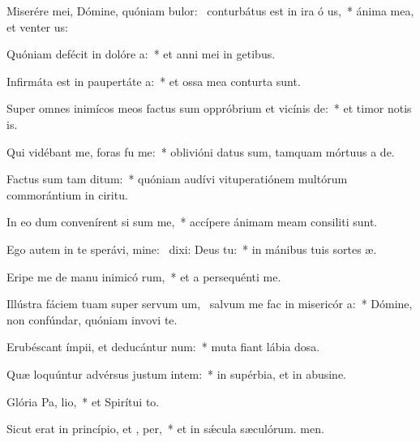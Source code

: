 \item Miserére mei, Dómine, quóniam bulor:~\pscross{} conturbátus est in ira ó us,~* ánima mea, et venter us:
\item Quóniam defécit in dolóre  a:~* et anni mei in getibus.
\item Infirmáta est in paupertáte  a:~* et ossa mea conturta sunt.
\item Super omnes inimícos meos factus sum oppróbrium et vicínis  de:~* et timor notis is.
\item Qui vidébant me, foras fu  me:~* oblivióni datus sum, tamquam mórtuus a de.
\item Factus sum tam  ditum:~* quóniam audívi vituperatiónem multórum commorántium in ciritu.
\item In eo dum convenírent si sum me,~* accípere ánimam meam consiliti sunt.
\item Ego autem in te sperávi, mine:~\pscross{} dixi: Deus   tu:~* in mánibus tuis sortes æ.
\item Eripe me de manu inimicó rum,~* et a persequénti me.
\item Illústra fáciem tuam super servum um,~\pscross{} salvum me fac in misericór a:~* Dómine, non confúndar, quóniam invovi te.
\item Erubéscant ímpii, et deducántur  num:~* muta fiant lábia dosa.
\item Quæ loquúntur advérsus justum intem:~* in supérbia, et in abusine.
\item Glória Pa,  lio,~* et Spirítui to.
\item Sicut erat in princípio, et ,  per,~* et in sǽcula sæculórum. men.
